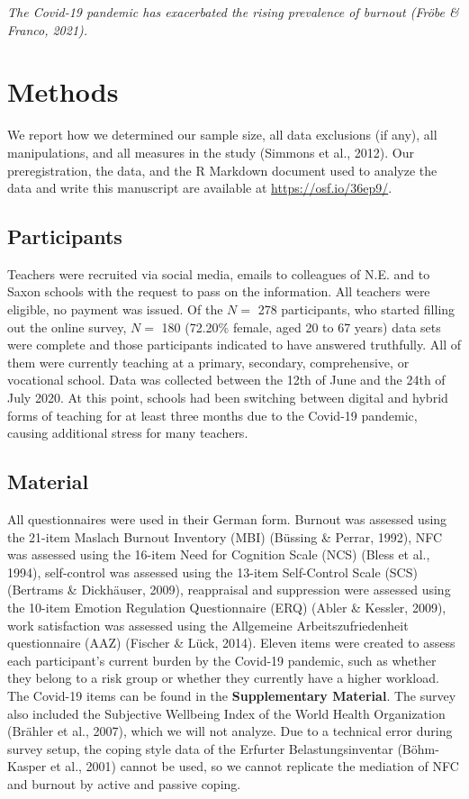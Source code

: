 \documentclass[
  english,
  man]{apa6}
\begin{document}
\emph{The Covid-19 pandemic has exacerbated the rising prevalence of burnout (Fröbe \& Franco, 2021).}

\hypertarget{methods}{%
\section{Methods}\label{methods}}

We report how we determined our sample size, all data exclusions (if any), all manipulations, and all measures in the study (Simmons et al., 2012).
Our preregistration, the data, and the R Markdown document used to analyze the data and write this manuscript are available at \url{https://osf.io/36ep9/}.

\hypertarget{participants}{%
\subsection{Participants}\label{participants}}

Teachers were recruited via social media, emails to colleagues of N.E. and to Saxon schools with the request to pass on the information.
All teachers were eligible, no payment was issued.
Of the \(N=\) 278 participants, who started filling out the online survey, \(N=\) 180 (72.20\% female, aged 20 to 67 years) data sets were complete and those participants indicated to have answered truthfully.
All of them were currently teaching at a primary, secondary, comprehensive, or vocational school.
Data was collected between the 12th of June and the 24th of July 2020.
At this point, schools had been switching between digital and hybrid forms of teaching for at least three months due to the Covid-19 pandemic, causing additional stress for many teachers.

\hypertarget{material}{%
\subsection{Material}\label{material}}

All questionnaires were used in their German form. Burnout was assessed using the 21-item Maslach Burnout Inventory (MBI) (Büssing \& Perrar, 1992), NFC was assessed using the 16-item Need for Cognition Scale (NCS) (Bless et al., 1994), self-control was assessed using the 13-item Self-Control Scale (SCS) (Bertrams \& Dickhäuser, 2009), reappraisal and suppression were assessed using the 10-item Emotion Regulation Questionnaire (ERQ) (Abler \& Kessler, 2009), work satisfaction was assessed using the Allgemeine Arbeitszufriedenheit questionnaire (AAZ) (Fischer \& Lück, 2014).
Eleven items were created to assess each participant's current burden by the Covid-19 pandemic, such as whether they belong to a risk group or whether they currently have a higher workload.
The Covid-19 items can be found in the \textbf{Supplementary Material}.
The survey also included the Subjective Wellbeing Index of the World Health Organization (Brähler et al., 2007), which we will not analyze.
Due to a technical error during survey setup, the coping style data of the Erfurter Belastungsinventar (Böhm-Kasper et al., 2001) cannot be used, so we cannot replicate the mediation of NFC and burnout by active and passive coping.
\end{document}
